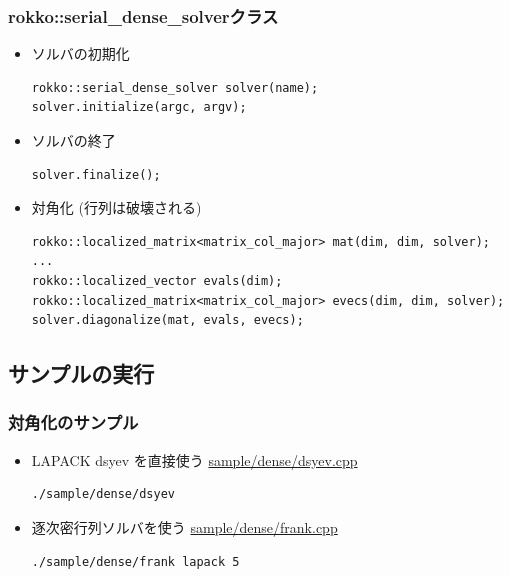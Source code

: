 \begin{frame}[c,fragile]
  \frametitle{rokko::serial\_dense\_solverクラス}
  \begin{itemize}
  \item ソルバの初期化
\begin{lstlisting}
rokko::serial_dense_solver solver(name);
solver.initialize(argc, argv);
\end{lstlisting}
  \item ソルバの終了
\begin{lstlisting}
solver.finalize();
\end{lstlisting}
  \item 対角化 (行列は破壊される)
\begin{lstlisting}
rokko::localized_matrix<matrix_col_major> mat(dim, dim, solver);
...
rokko::localized_vector evals(dim);
rokko::localized_matrix<matrix_col_major> evecs(dim, dim, solver);
solver.diagonalize(mat, evals, evecs);
\end{lstlisting}
  \end{itemize}
\end{frame}

\subsection{サンプルの実行}

\begin{frame}[c,fragile]
  \frametitle{対角化のサンプル}
  \begin{itemize}
  \item LAPACK dsyev を直接使う \href{https://github.com/t-sakashita/rokko/blob/master/sample/dense/dsyev.c}{sample/dense/dsyev.cpp}
\begin{lstlisting}[style=shstyle]
./sample/dense/dsyev
\end{lstlisting}
  \item 逐次密行列ソルバを使う \href{https://github.com/t-sakashita/rokko/blob/master/sample/dense/frank_dense.cpp}{sample/dense/frank.cpp}
\begin{lstlisting}[style=shstyle]
./sample/dense/frank lapack 5
\end{lstlisting}
  \end{itemize}
\end{frame}

